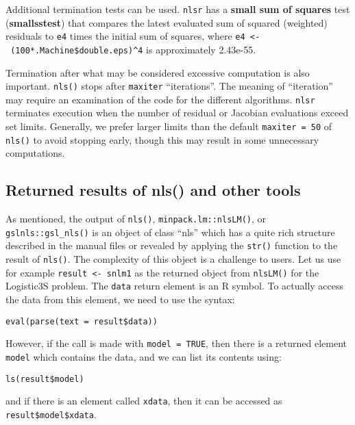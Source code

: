 Additional termination tests can be used. \texttt{nlsr} has a \textbf{small sum of
squares} test (\textbf{smallsstest}) that compares the latest evaluated sum of squared
(weighted) residuals to \texttt{e4} times the initial sum of squares, where
\texttt{e4\ \textless{}-\ (100*.Machine\$double.eps)\^{}4} is approximately 2.43e-55.

Termination after what may be considered excessive computation is also important.
\texttt{nls()} stops after \texttt{maxiter} ``iterations''. The meaning of ``iteration'' may require an
examination of the code for the different algorithms. \texttt{nlsr} terminates execution
when the number of residual or Jacobian evaluations exceed set limits. Generally,
we prefer larger limits than the default \texttt{maxiter\ =\ 50} of \texttt{nls()} to avoid stopping
early, though this may result in some unnecessary computations.

\hypertarget{returned-results-of-nls-and-other-tools}{%
\subsection{Returned results of nls() and other tools}\label{returned-results-of-nls-and-other-tools}}

As mentioned, the output of \texttt{nls()}, \texttt{minpack.lm::nlsLM()}, or
\texttt{gslnls::gsl\_nls()} is an object of class ``nls'' which has a quite rich structure
described in the manual files or revealed by applying the \texttt{str()} function to the
result of \texttt{nls()}. The complexity of this object is a challenge to users. Let us
use for example \texttt{result\ \textless{}-\ snlm1} as the returned object from \texttt{nlsLM()} for the
Logistic3S problem. The \texttt{data} return element
is an R symbol. To actually access the data from this element, we need to use
the syntax:

\begin{verbatim}
eval(parse(text = result$data))
\end{verbatim}

However, if the call is made with \texttt{model\ =\ TRUE}, then there is a returned element
\texttt{model} which contains the data, and we can list its contents using:

\begin{verbatim}
ls(result$model)
\end{verbatim}

and if there is an element called \texttt{xdata}, then it can be accessed as
\texttt{result\$model\$xdata}.


